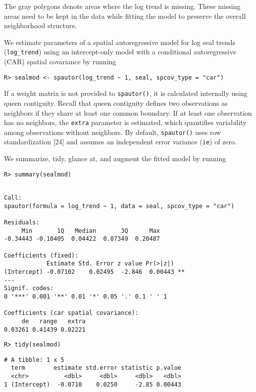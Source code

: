 \documentclass[10pt,letterpaper]{article}
\begin{document}
The gray polygons denote areas where the log trend is missing. These
missing areas need to be kept in the data while fitting the model to
preserve the overall neighborhood structure.

We estimate parameters of a spatial autoregressive model for log seal
trends (\texttt{log\_trend}) using an intercept-only model with a
conditional autoregressive (CAR) spatial covariance by running

\begin{verbatim}
R> sealmod <- spautor(log_trend ~ 1, seal, spcov_type = "car")
\end{verbatim}

If a weight matrix is not provided to \texttt{spautor()}, it is
calculated internally using queen contiguity. Recall that queen
contiguity defines two observations as neighbors if they share at least
one common boundary. If at least one observation has no neighbors, the
\texttt{extra} parameter is estimated, which quantifies variability
among observations without neighbors. By default, \texttt{spautor()}
uses row standardization {[}24{]} and assumes an independent error
variance (\texttt{ie}) of zero.

We summarize, tidy, glance at, and augment the fitted model by running

\begin{verbatim}
R> summary(sealmod)
\end{verbatim}

\begin{verbatim}

Call:
spautor(formula = log_trend ~ 1, data = seal, spcov_type = "car")

Residuals:
     Min       1Q   Median       3Q      Max 
-0.34443 -0.10405  0.04422  0.07349  0.20487 

Coefficients (fixed):
            Estimate Std. Error z value Pr(>|z|)   
(Intercept) -0.07102    0.02495  -2.846  0.00443 **
---
Signif. codes:  
0 '***' 0.001 '**' 0.01 '*' 0.05 '.' 0.1 ' ' 1

Coefficients (car spatial covariance):
     de   range   extra 
0.03261 0.41439 0.02221 
\end{verbatim}

\begin{verbatim}
R> tidy(sealmod)
\end{verbatim}

\begin{verbatim}
# A tibble: 1 x 5
  term        estimate std.error statistic p.value
  <chr>          <dbl>     <dbl>     <dbl>   <dbl>
1 (Intercept)  -0.0710    0.0250     -2.85 0.00443
\end{verbatim}
\end{document}
